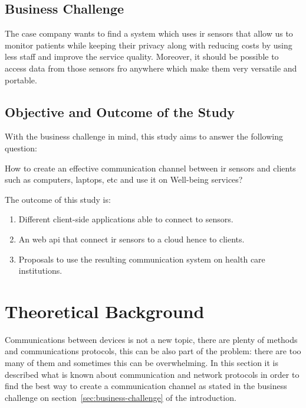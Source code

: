 \documentclass[hidelinks,11pt,a4paper,oneside,article]{memoir}
\begin{document}
\section*{Business Challenge}\label{sec:business-challenge}
The case company wants to find a system which uses \gls{ir} sensors that allow us to monitor patients while keeping their privacy along with reducing costs by using less staff and improve the service quality. Moreover, it should be possible to access data from those sensors fro anywhere which make them very versatile and portable.

\section*{Objective and Outcome of the Study}
With the business challenge in mind, this study aims to answer the following question:
\begin{displayquote}
{\large  How to create an effective communication channel between \gls{ir} sensors and clients such as computers, laptops, etc and use it on Well-being services?}
\end{displayquote}

The outcome of this study is:
\begin{enumerate}
\item Different client-side applications able to connect to sensors.
\item An web \gls{api} that connect \gls{ir} sensors to a cloud hence to clients.
\item Proposals to use the resulting communication system on health care institutions.
\end{enumerate}



\clearpage\chapter{Theoretical Background}\label{sec:theoretical-background}

Communications between devices is not a new topic, there are plenty of methods and communications protocols, this can be also part of the problem: there are too many of them and sometimes this can be overwhelming. In this section it is described what is known about communication and network protocols in order to find the best way to create a communication channel as stated in the business challenge on section~\ref{sec:business-challenge} of the introduction.
\end{document}
